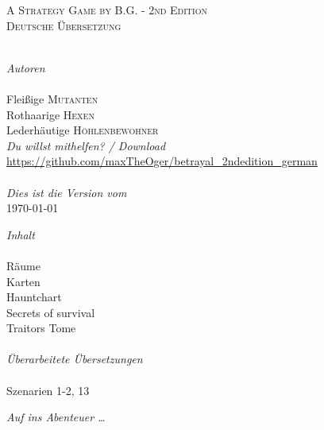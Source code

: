 \begin{titlepage}
\begin{center}
\textsc{A Strategy Game by B.G. - 2nd Edition}\\[1.5cm]

\textsc{\Large Deutsche Übersetzung}\\[0.5cm]



\HRule \\[1.5cm]

\begin{minipage}{0.4\textwidth}
\begin{flushleft} \large
\emph{Autoren}\\
\\[0.3cm]
Fleißige \textsc{Mutanten}\\
Rothaarige \textsc{Hexen}\\
Lederhäutige \textsc{Höhlenbewohner}
\\[1.5cm]
\emph{Du willst mithelfen? / Download}
\\[0.3cm]
\url{https://github.com/maxTheOger/betrayal\_2ndedition\_german}\\
\\[1.5cm]
\emph{Dies ist die Version vom}
\\[0.3cm]
{\large \today}


\end{flushleft}
\end{minipage}
\hfill
\begin{minipage}{0.4\textwidth}
\begin{flushright} \large
\emph{Inhalt} \\
\\[0.3cm]
Räume \\
Karten \\
Hauntchart \\
Secrets of survival \\
Traitors Tome \\
\\[1.5cm]
\emph{Überarbeitete Übersetzungen}\\
\\[0.3cm]
Szenarien 1-2, 13
\end{flushright}
\end{minipage}

\vfill

{\emph{Auf ins Abenteuer …}}

\end{center}

\end{titlepage}